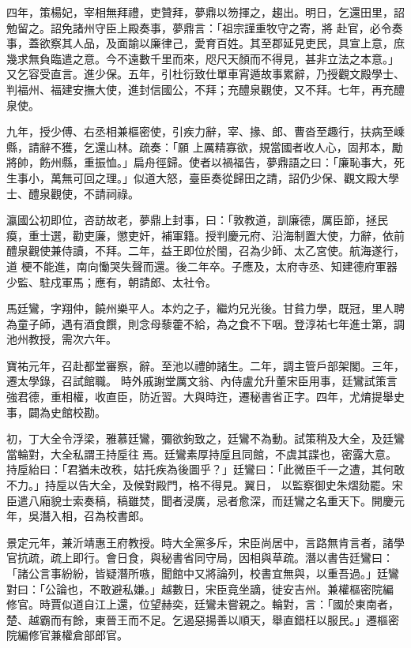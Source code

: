 \begin{pinyinscope}
 四年，策楊妃，宰相無拜禮，吏贊拜，夢鼎以笏揮之，趨出。明日，乞還田里，詔勉留之。詔免諸州守臣上殿奏事，夢鼎言：「祖宗謹重牧守之寄，將
 赴官，必令奏事，蓋欲察其人品，及面諭以廉律己，愛育百姓。其至郡延見吏民，具宣上意，庶幾求無負臨遣之意。今不遠數千里而來，咫尺天顏而不得見，甚非立法之本意。」又乞容受直言。進少保。五年，引杜衍致仕單車宵遁故事累辭，乃授觀文殿學士、判福州、福建安撫大使，進封信國公，不拜；充醴泉觀使，又不拜。七年，再充醴泉使。



 九年，授少傅、右丞相兼樞密使，引疾力辭，宰、掾、郎、曹沓至趣行，扶病至嵊縣，請辭不獲，乞還山林。疏奏：「願
 上厲精寡欲，規當國者收人心，固邦本，勵將帥，飭州縣，重振恤。」扁舟徑歸。使者以禍福告，夢鼎語之曰：「廉恥事大，死生事小，萬無可回之理。」似道大怒，臺臣奏從歸田之請，詔仍少保、觀文殿大學士、醴泉觀使，不請祠祿。



 瀛國公初即位，咨訪故老，夢鼎上封事，曰：「敦教道，訓廉德，厲臣節，拯民瘼，重士選，勸吏廉，懲吏奸，補軍籍。授判慶元府、沿海制置大使，力辭，依前醴泉觀使兼侍讀，不拜。二年，益王即位於閩，召為少師、太乙宮使。航海遂行，道
 梗不能進，南向慟哭失聲而還。後二年卒。子應及，太府寺丞、知建德府軍器少監、駐戍軍馬；應有，朝請郎、太社令。



 馬廷鸞，字翔仲，饒州樂平人。本灼之子，繼灼兄光後。甘貧力學，既冠，里人聘為童子師，遇有酒食饌，則念母藜藿不給，為之食不下咽。登淳祐七年進士第，調池州教授，需次六年。



 寶祐元年，召赴都堂審察，辭。至池以禮帥諸生。二年，調主管戶部架閣。三年，遷太學錄，召試館職。
 時外戚謝堂厲文翁、內侍盧允升董宋臣用事，廷鸞試策言強君德，重相權，收直臣，防近習。大與時迕，遷秘書省正字。四年，尤焴提舉史事，闢為史館校勘。



 初，丁大全令浮梁，雅慕廷鸞，彌欲鉤致之，廷鸞不為動。試策稍及大全，及廷鸞當輪對，大全私謂王持垕往𣊺焉。廷鸞素厚持垕且同館，不虞其諜也，密露大意。持垕紿曰：「君猶未改秩，姑托疾為後圖乎？」廷鸞曰：「此微臣千一之遭，其何敢不力。」持垕以告大全，及候對殿門，格不得見。翼日，
 以監察御史朱熠劾罷。宋臣遣八廂貌士索奏稿，稿雖焚，聞者浸廣，忌者愈深，而廷鸞之名重天下。開慶元年，吳潛入相，召為校書郎。



 景定元年，兼沂靖惠王府教授。時大全黨多斥，宋臣尚居中，言路無肯言者，諸學官抗疏，疏上即行。會日食，與秘書省同守局，因相與草疏。潛以書告廷鸞曰：「諸公言事紛紛，皆疑潛所嗾，聞館中又將論列，校書宜無與，以重吾過。」廷鸞對曰：「公論也，不敢避私嫌。」越數日，宋臣竟坐謫，徙安吉州。兼權樞密院編
 修官。時賈似道自江上還，位望赫奕，廷鸞未嘗親之。輪對，言：「國於東南者，楚、越霸而有餘，東晉王而不足。乞遏惡揚善以順天，舉直錯枉以服民。」遷樞密院編修官兼權倉部郎官。




\end{pinyinscope}
